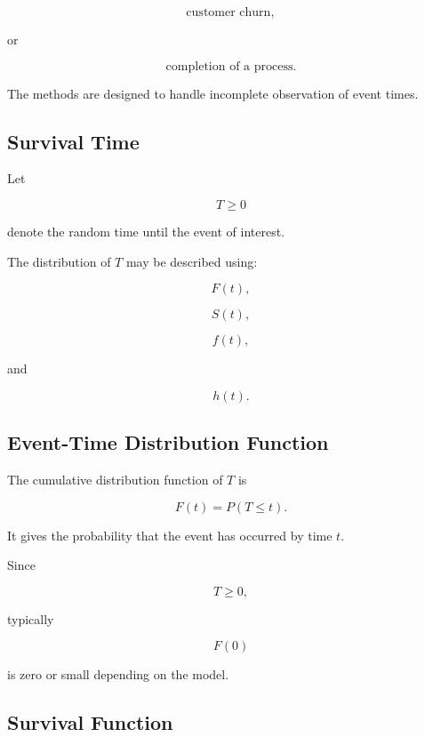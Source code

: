 \[
\boxed{
\text{customer churn},
}
\]

or

\[
\boxed{
\text{completion of a process}.
}
\]

The methods are designed to handle incomplete observation of event times.

\subsection{Survival Time}
\label{subsec:survival-time}

Let

\[
\boxed{
T\geq0
}
\]

denote the random time until the event of interest.

The distribution of \(T\) may be described using:

\[
\boxed{
F(t),
}
\]

\[
\boxed{
S(t),
}
\]

\[
\boxed{
f(t),
}
\]

and

\[
\boxed{
h(t).
}
\]

\subsection{Event-Time Distribution Function}
\label{subsec:event-time-cdf}

The cumulative distribution function of \(T\) is

\[
\boxed{
F(t)
=
P(T\leq t).
}
\]

It gives the probability that the event has occurred by time \(t\).

Since

\[
T\geq0,
\]

typically

\[
F(0)
\]

is zero or small depending on the model.

\subsection{Survival Function}
\label{subsec:survival-function}

